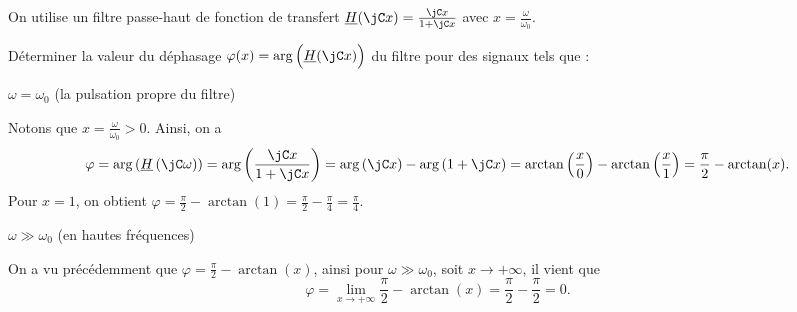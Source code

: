 On utilise un filtre passe-haut de fonction de transfert $\underline{H}(\jC x)=\frac{\jC x}{1+\jC x}$ avec $x=\frac{\omega}{\omega_0}$.

Déterminer la valeur du déphasage $\varphi(x) = \arg \Big( \underline{H}(\jC x) \Big)$ du filtre pour des signaux tels que :

\debutEntrainement


\begin{enonce}
	 $\omega = \omega_0$ (la pulsation propre du filtre)
\end{enonce}


\begin{corrige}
	Notons que $x = \frac{\omega}{\omega_0} > 0$. Ainsi, on a
	\[
		\varphi = \arg\left(\underline{H}\left(\jC\omega \right) \right)
		= \arg\left( \frac{\jC x}{1 + \jC x} \right)
		=\arg\left(\jC x\right) - \arg\left(1+\jC x\right)
		=\arctan\left( \frac{x}{0} \right) - \arctan\left( \frac{x}{1} \right)
		=\frac{\pi}{2} -\arctan(x).
	\]
	Pour $x=1$, on obtient $\varphi = \frac{\pi}{2} -\arctan(1) = \frac{\pi}{2} - \frac{\pi}{4} = \frac{\pi}{4}$.
\end{corrige}



\begin{enonce}
	$\omega \gg \omega_0$ (en hautes fréquences) 
\end{enonce}


\begin{corrige}
	On a vu précédemment que $\varphi=\frac{\pi}{2} - \arctan(x)$, ainsi pour $\omega \gg \omega_0$, soit $x \rightarrow +\infty$, il vient que
\[
	\varphi = \lim_{x \rightarrow +\infty} \frac{\pi}{2} - \arctan(x) = \frac{\pi}{2} - \frac{\pi}{2} = 0.
\]
\end{corrige}



